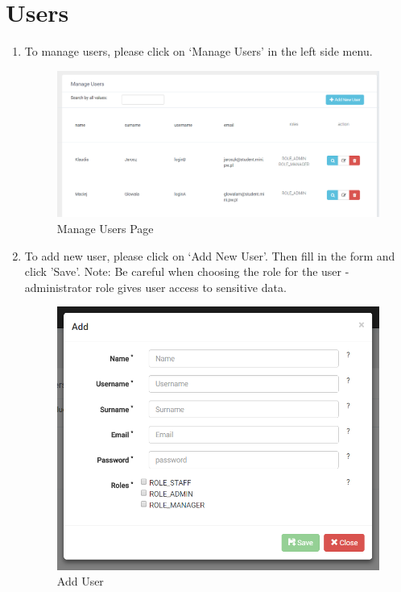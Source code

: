 \documentclass[a4paper,11pt,twoside]{report}
\theoremstyle{definition}
\begin{document}
\section{Users}
\begin{enumerate}
\item To manage users, please click on ‘Manage Users’ in the left side menu. 


\begin{figure}[h!]
\begin{center}
\includegraphics[width=\textwidth]{AS/users/1}
\end{center}
\caption{Manage Users Page}
\end{figure}
\thispagestyle{empty}


\item To add new user, please click on ‘Add New User’. Then fill in the form and click 'Save'. Note: Be careful when choosing the role for the user - administrator role gives user access to sensitive data.

\begin{figure}[h!]
\begin{center}
\includegraphics[width=\textwidth]{AS/users/2}
\end{center}
\caption{Add User}
\end{figure}
\thispagestyle{empty}



\end{enumerate}
\end{document}
